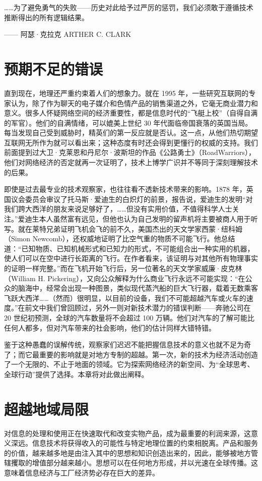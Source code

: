 \begin{tcolorbox}
……为了避免勇气的失败——历史对此给予过严厉的惩罚，我们必须敢于遵循技术推断得出的所有逻辑结果。
\begin{flushright}
—— 阿瑟·克拉克 ARTHER C. CLARK    
\end{flushright}
\end{tcolorbox}

\section{预期不足的错误}
直到现在，地理还严重约束着人们的想象力。就在 1995 年，一些研究互联网的专家认为，除了作为聊天的电子媒介和色情产品的销售渠道之外，它毫无商业潜力和意义。很多人怀疑网络空间的经济重要性，都是信息时代的“飞艇上校”（自得自满的军官）。他们的自满情绪，可以媲美上世纪 30 年代面临帝国衰落的英国当局。每当发现自己受到威胁时，精英们的第一反应就是否认。这一点，从他们热切期望互联网无所作为就可以看出来；这种态度有时还会得到更懂行的权威的支持。我们前面提到过大卫·克莱恩和丹尼尔·波斯坦的作品《公路勇士》（RoadWarriors），他们对网络经济的否定就再一次证明了，技术上博学广识并不等同于深刻理解技术的后果。

即使是过去最专业的技术观察家，也往往看不透新技术带来的影响。1878 年，英国议会委员会审议了托马斯·爱迪生的白炽灯的前景，报告说，爱迪生的发明“对我们跨大西洋的朋友来说足够好了，……但没有实用价值，不值得科学人士关注。”爱迪生本人虽然富有远见，但他也认为自己发明的留声机将主要被商人用于听写。就在莱特兄弟证明飞机会飞的前不久，美国杰出的天文学家西蒙·纽科姆（Simon Newcomb），还权威地证明了比空气重的物质不可能飞行。他总结道：“已知物质、已知机械形式和已知力的形式，不可能组合出一种实用的机器，使人们可以在空中进行长距离的飞行。在作者看来，该证明与对其他所有物理事实的证明一样完整。”而在飞机开始飞行后，另一位著名的天文学家威廉·皮克林（William H. Pickering），又向公众解释为什么商业飞行永远不可能实现：“在公众的脑海中，经常会出现一种图景，类似现代蒸汽船的巨大飞行器，载着无数乘客飞跃大西洋……（然而）很明显，以目前的设备，我们不可能超越汽车或火车的速度。”在前文中我们曾回顾过，另外一则对新技术潜力的错误判断——奔驰公司在 20 世纪初预测，全球的汽车数量将不会超过 100 万辆。他们对汽车的了解可能比任何人都多，但对汽车带来的社会影响，他们的估计同样大错特错。

鉴于这种愚蠢的误解传统，观察家们迟迟不能把握信息技术的意义也就不足为奇了；而它最重要的影响就是对地方专制的超越。第一次，新的技术为经济活动创造了一个无限的、不止于地面的领域。它为探索网络经济的新空间、为“全球思考、全球行动”提供了选择。本章将对此做出阐释。

\section{超越地域局限}
对信息的处理和使用正在快速取代和改变实物产品，成为最重要的利润来源，这意义深远。信息技术将获得收入的可能性与特定地理位置的约束相脱离。产品和服务的价值，越来越多地是由注入其中的思想和知识创造出来的，因此，能够被地方管辖攫取的增值部分越来越小。思想可以在任何地方形成，并以光速在全球传播。这意味着信息经济与工厂经济势必存在巨大的差异。


